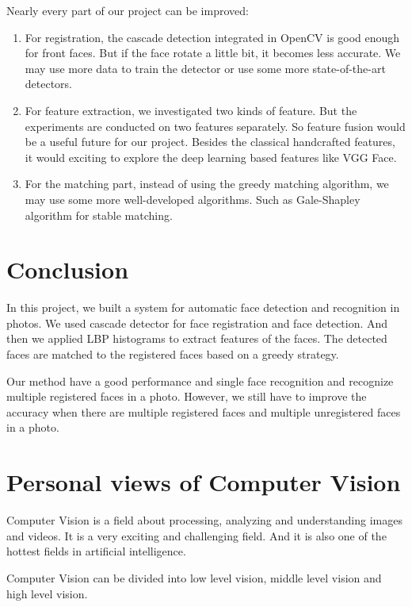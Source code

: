 \documentclass[paper=a4, fontsize=11pt]{scrartcl} %
\numberwithin{equation}{section} %
\numberwithin{figure}{section} %
\numberwithin{table}{section} %
\begin{document}
Nearly every part of our project can be improved:
\begin{enumerate}
	\item For registration, the cascade detection integrated in OpenCV is good enough for front faces. But if the face rotate a little bit, it becomes less accurate. We may use more data to train the detector or use some more state-of-the-art detectors.
	\item For feature extraction, we investigated two kinds of feature. But the experiments are conducted on two features separately. So feature fusion would be a useful future for our project. Besides the classical handcrafted features, it would exciting to explore the deep learning based features like VGG Face\cite{Parkhi15}.
	\item For the matching part, instead of using the greedy matching algorithm, we may use some more well-developed algorithms. Such as Gale-Shapley algorithm for stable matching\cite{gale1962college}.
\end{enumerate}

\section{Conclusion}
In this project, we built a system for automatic face detection and recognition in photos. We used cascade detector for face registration and face detection. And then we applied LBP histograms to extract features of the faces. The detected faces are matched to the registered faces based on a greedy strategy.

Our method have a good performance and single face recognition and recognize multiple registered faces in a photo. However, we still have to improve the accuracy when there are multiple registered faces and multiple unregistered faces in a photo.

\newpage



\newpage
\section*{Personal views of Computer Vision}
Computer Vision is a field about processing, analyzing and understanding images and videos. It is a very exciting and challenging field. And it is also one of the hottest fields in artificial intelligence.

Computer Vision can be divided into low level vision, middle level vision and high level vision. 
\end{document}
